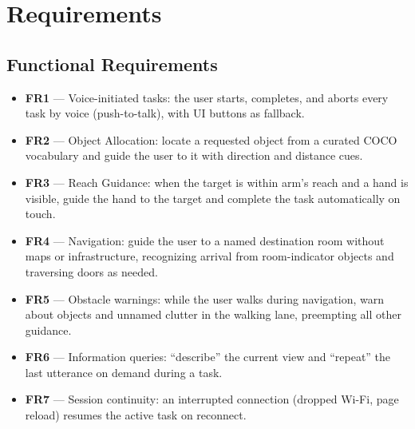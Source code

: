 \section{Requirements}
\label{sec:requirements}

\subsection{Functional Requirements}
\begin{itemize}[nosep]
  \item \textbf{FR1} --- Voice-initiated tasks: the user starts, completes, and
        aborts every task by voice (push-to-talk), with UI buttons as fallback.
  \item \textbf{FR2} --- Object Allocation: locate a requested object from a curated
        COCO vocabulary and guide the user to it with direction and distance cues.
  \item \textbf{FR3} --- Reach Guidance: when the target is within arm's reach and a
        hand is visible, guide the hand to the target and complete the task
        automatically on touch.
  \item \textbf{FR4} --- Navigation: guide the user to a named destination room
        without maps or infrastructure, recognizing arrival from room-indicator
        objects and traversing doors as needed.
  \item \textbf{FR5} --- Obstacle warnings: while the user walks during navigation,
        warn about objects and unnamed clutter in the walking lane, preempting all
        other guidance.
  \item \textbf{FR6} --- Information queries: ``describe'' the current view and
        ``repeat'' the last utterance on demand during a task.
  \item \textbf{FR7} --- Session continuity: an interrupted connection (dropped
        Wi-Fi, page reload) resumes the active task on reconnect.
\end{itemize}

